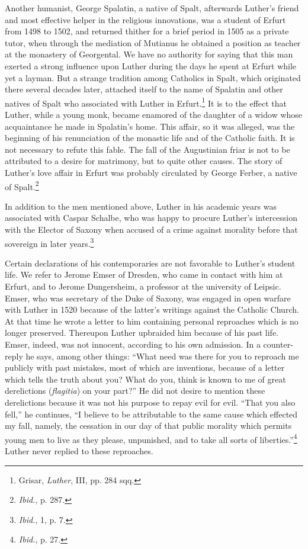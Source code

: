 Another humanist, George Spalatin, a native of Spalt, afterwards
Luther’s friend and most effective helper in the religious innovations,
was a student of Erfurt from 1498 to 1502, and returned thither
for a brief period in 1505 as a private tutor, when through the
mediation of Mutianus he obtained a position as teacher at the
monastery of Georgental. We have no authority for saying that this
man exerted a strong influence upon Luther during the days
he spent at Erfurt while yet a layman. But a strange tradition among
Catholics in Spalt, which originated there several decades later, attached
itself to the name of Spalatin and other natives of Spalt who
associated with Luther in Erfurt.\footnote{Grisar, \textit{Luther}, III, pp. 284 sqq.}
It is to the effect that Luther,
while a young monk, became enamored of the daughter of a widow
whose acquaintance he made in Spalatin’s home. This affair, so it was
alleged, was the beginning of his renunciation of the monastic life
and of the Catholic faith. It is not necessary to refute this fable.
The fall of the Augustinian friar is not to be attributed to a desire
for matrimony, but to quite other causes. The story of Luther’s love
affair in Erfurt was probably circulated by George Ferber, a native
of Spalt.\footnote{\textit{Ibid.}, p. 287.}

In addition to the men mentioned above, Luther in his academic
years was associated with Caspar Schalbe, who was happy to procure
Luther’s intercession with the Elector of Saxony when accused of
a crime against morality before that sovereign in later years.\footnote{\textit{Ibid.}, 1, p. 7.}

Certain declarations of his contemporaries are not favorable to
Luther’s student life. We refer to Jerome Emser of Dresden, who
came in contact with him at Erfurt, and to Jerome Dungersheim, a
professor at the university of Leipsic. Emser, who was secretary of the
Duke of Saxony, was engaged in open warfare with Luther in 1520
because of the latter’s writings against the Catholic Church. At that
time he wrote a letter to him containing personal reproaches which
is no longer preserved. Thereupon Luther upbraided him because
of his past life. Emser, indeed, was not innocent, according to his own
admission. In a counter-reply he says, among other things: “What
need was there for you to reproach me publicly with past mistakes,
most of which are inventions, because of a letter which tells the truth
about you? What do you, think is known to me of great derelictions
(\textit{flagitia}) on your part?” He did not desire to mention these derelictions
because it was not his purpose to repay evil for evil. “That
you also fell,” he continues, “I believe to be attributable to the same
cause which effected my fall, namely, the cessation in our day of that
public morality which permits young men to live as they please,
unpunished, and to take all sorts of liberties.”\footnote{\textit{Ibid.}, p. 27.}
Luther never replied to these reproaches.

